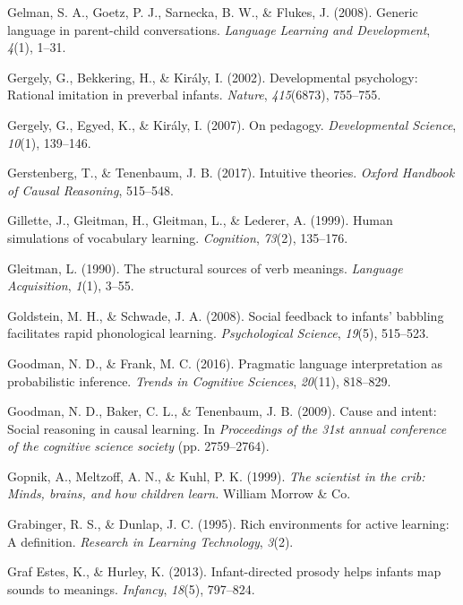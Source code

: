 \documentclass[oneside]{report}
\begin{document}
\hypertarget{ref-gelman2008generic}{}
Gelman, S. A., Goetz, P. J., Sarnecka, B. W., \& Flukes, J. (2008).
Generic language in parent-child conversations. \emph{Language Learning
and Development}, \emph{4}(1), 1--31.

\hypertarget{ref-gergely2002developmental}{}
Gergely, G., Bekkering, H., \& Király, I. (2002). Developmental
psychology: Rational imitation in preverbal infants. \emph{Nature},
\emph{415}(6873), 755--755.

\hypertarget{ref-gergely2007pedagogy}{}
Gergely, G., Egyed, K., \& Király, I. (2007). On pedagogy.
\emph{Developmental Science}, \emph{10}(1), 139--146.

\hypertarget{ref-gerstenberg2017intuitive}{}
Gerstenberg, T., \& Tenenbaum, J. B. (2017). Intuitive theories.
\emph{Oxford Handbook of Causal Reasoning}, 515--548.

\hypertarget{ref-gillette1999human}{}
Gillette, J., Gleitman, H., Gleitman, L., \& Lederer, A. (1999). Human
simulations of vocabulary learning. \emph{Cognition}, \emph{73}(2),
135--176.

\hypertarget{ref-gleitman1990structural}{}
Gleitman, L. (1990). The structural sources of verb meanings.
\emph{Language Acquisition}, \emph{1}(1), 3--55.

\hypertarget{ref-goldstein2008social}{}
Goldstein, M. H., \& Schwade, J. A. (2008). Social feedback to infants'
babbling facilitates rapid phonological learning. \emph{Psychological
Science}, \emph{19}(5), 515--523.

\hypertarget{ref-goodman2016pragmatic}{}
Goodman, N. D., \& Frank, M. C. (2016). Pragmatic language
interpretation as probabilistic inference. \emph{Trends in Cognitive
Sciences}, \emph{20}(11), 818--829.

\hypertarget{ref-goodman2009cause}{}
Goodman, N. D., Baker, C. L., \& Tenenbaum, J. B. (2009). Cause and
intent: Social reasoning in causal learning. In \emph{Proceedings of the
31st annual conference of the cognitive science society} (pp.
2759--2764).

\hypertarget{ref-gopnik1999scientist}{}
Gopnik, A., Meltzoff, A. N., \& Kuhl, P. K. (1999). \emph{The scientist
in the crib: Minds, brains, and how children learn.} William Morrow \&
Co.

\hypertarget{ref-grabinger1995rich}{}
Grabinger, R. S., \& Dunlap, J. C. (1995). Rich environments for active
learning: A definition. \emph{Research in Learning Technology},
\emph{3}(2).

\hypertarget{ref-graf2013infant}{}
Graf Estes, K., \& Hurley, K. (2013). Infant-directed prosody helps
infants map sounds to meanings. \emph{Infancy}, \emph{18}(5), 797--824.
\end{document}
